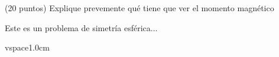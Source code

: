 \question [1] (20 puntos) Explique prevemente qué tiene que ver el momento magnético 

\begin{solution}
Este es un problema de simetría esférica...



\end{solution}

vspace{1.0cm}
